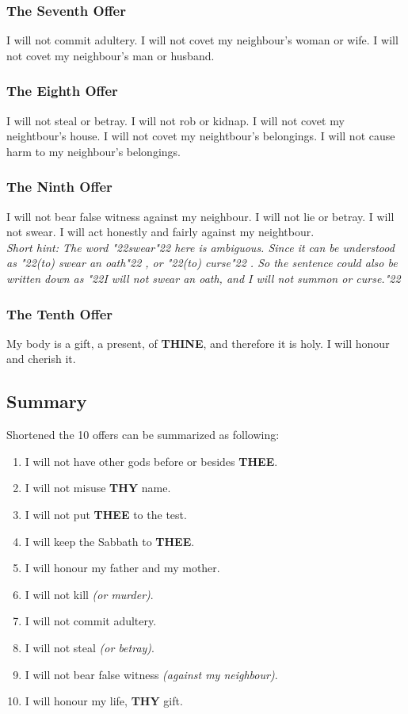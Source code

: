 \documentclass[12pt,a4paper]{article}
\newcommand{\Thee}[0]{\textbf{THEE}}
\newcommand{\Thine}[0]{\textbf{THINE}}
\newcommand{\Thy}[0]{\textbf{THY}}
\newcommand{\q}[1]{\char"22{#1}\char"22 }
\begin{document}
	\subsubsection{The Seventh Offer}
		I will not commit adultery.
		I will not covet my neighbour's woman or wife.
		I will not covet my neighbour's man or husband.
		
	\subsubsection{The Eighth Offer}
		I will not steal or betray.
		I will not rob or kidnap.
		I will not covet my neightbour's house.
		I will not covet my neightbour's belongings.
		I will not cause harm to my neighbour's belongings.
		
	\subsubsection{The Ninth Offer} \label{TheNinthOffer}
		I will not bear false witness against my neighbour.
		I will not lie or betray.
		I will not swear.
		I will act honestly and fairly against my neightbour.
		\\
		\textit{Short hint:
		The word \q{swear} here is ambiguous.
		Since it can be understood as \q{(to) swear an oath},
		or \q{(to) curse}.
		So the sentence could also be written down as
		\q{I will not swear an oath, and I will not summon or curse.}}
		
	\subsubsection{The Tenth Offer} \label{TheTenthOffer}
		My body is a gift, a present, of {\Thine},
		and therefore it is holy.
		I will honour and cherish it.

	\subsection{Summary}
		Shortened the 10 offers can be summarized as following:
		\\
		\begin{enumerate}[nosep]
			\item I will not have other gods before or besides {\Thee}.
			\item I will not misuse {\Thy} name.
			\item I will not put {\Thee} to the test.
			\item I will keep the Sabbath to {\Thee}.
			\item I will honour my father and my mother.
			\item I will not kill \textit{(or murder)}.
			\item I will not commit adultery.
			\item I will not steal \textit{(or betray)}.
			\item I will not bear false witness \textit{(against my neighbour)}.
			\item I will honour my life, {\Thy} gift.
		\end{enumerate}
		
\end{document}
